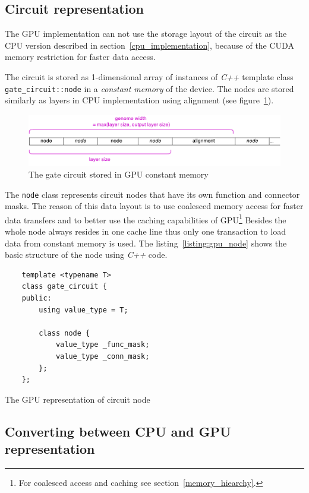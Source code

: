 \documentclass[12pt,oneside]{fithesis2}
\begin{document}
\subsection{Circuit representation}

The GPU implementation can not use the storage layout of the circuit as the CPU version described in section~\ref{cpu_implementation}, because of the CUDA memory restriction for faster data access.

The circuit is stored as 1-dimensional array of instances of \emph{C++} template class \texttt{gate\_circuit::node} in a \emph{constant memory} of the device. The nodes are stored similarly as layers in CPU implementation using alignment (see figure~\ref{fig:gpu_genome}).

\begin{figure}[h]
	\centering
	\includegraphics[width=\textwidth]{figures/gpu_genome.pdf}
	\caption{The gate circuit stored in GPU constant memory}
	\label{fig:gpu_genome}
\end{figure}


The \texttt{node} class represents circuit nodes that have its own function and connector masks. The reason of this data layout is to use coalesced memory access for faster data transfers and to better use the caching capabilities of GPU\footnote{For coalesced access and caching see section~\ref{memory_hiearchy}.} Besides the whole node always resides in one cache line thus only one transaction to load data from constant memory is used. The listing~\ref{listing:gpu_node} shows the basic structure of the node using \emph{C++} code.

\begin{listing}[h]
	\begin{verbatim}
	template <typename T>
	class gate_circuit {
	public:
		using value_type = T;
		
		class node {
			value_type _func_mask;
			value_type _conn_mask;
		};	
	};
	\end{verbatim}
	\caption{The GPU representation of circuit node}
	\label{listing:gpu_node}
\end{listing}

\subsection{Converting between CPU and GPU representation}
\end{document}
